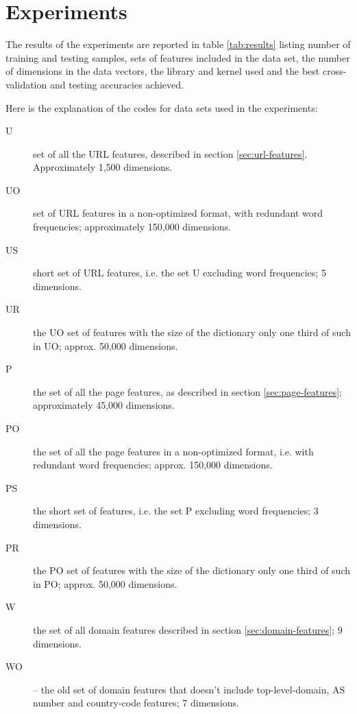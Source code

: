\documentclass{article}
\begin{document}
\section{Experiments}
\label{sec:experiments}




The results of the experiments are reported in table \ref{tab:results}
listing number of training and testing samples, sets of features
included in the data set, the number of dimensions in the data vectors,
the library and kernel used and the best cross-validation and testing
accuracies achieved. 

Here is the explanation of the codes for data sets used in the
experiments:
\begin{description}
  \item[U] set of all the URL features, described in section
  \ref{sec:url-features}. Approximately 1,500 dimensions.\\
  \item[UO] set of URL features in a non-optimized format, with redundant word
  frequencies; approximately 150,000 dimensions.\\
  \item[US] short set of URL features, i.e. the set U excluding word
  frequencies; 5 dimensions.\\
  \item[UR] the UO set of features with the size of the dictionary only
  one third of such in UO; approx. 50,000 dimensions.\\

  \item[P] the set of all the page features, as described in section
  \ref{sec:page-features}; approximately 45,000 dimensions.\\
  \item[PO] the set of all the page features in a non-optimized format, i.e. with
  redundant word frequencies; approx. 150,000 dimensions. \\
  \item[PS] the short set of features, i.e. the set P excluding word
  frequencies; 3 dimensions.\\
  \item[PR] the PO set of features with the size of the dictionary only
  one third of such in PO; approx. 50,000 dimensions.\\

  \item[W] the set of all domain features described in section
  \ref{sec:domain-features}; 9 dimensions.\\
  \item[WO] -- the old set of domain features that doesn't include
  top-level-domain, AS number and country-code features; 7 dimensions.
\end{description}
\end{document}
